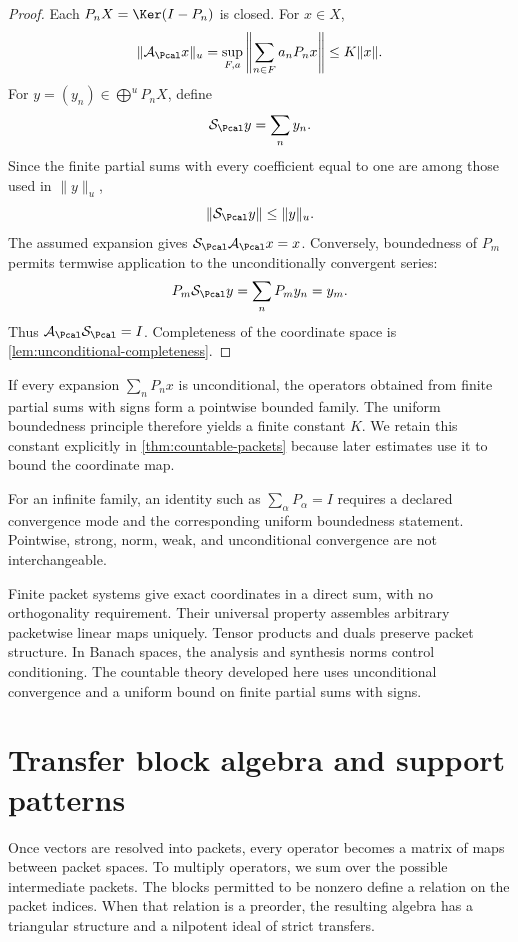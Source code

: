 \begin{proof}
Each $P_nX=\Ker(I-P_n)$ is closed.  For $x\in X$,
\[
\|\mathcal A_{\Pcal}x\|_u
=
\sup_{F,a}
\left\|\sum_{n\in F}a_nP_nx\right\|
\leq K\|x\|.
\]
For $y=(y_n)\in\bigoplus^uP_nX$, define
\[
\mathcal S_{\Pcal}y=\sum_ny_n.
\]
Since the finite partial sums with every coefficient equal to one are among those used in $\|y\|_u$,
\[
\|\mathcal S_{\Pcal}y\|
\leq\|y\|_u.
\]
The assumed expansion gives $\mathcal S_{\Pcal}\mathcal A_{\Pcal}x=x$.  Conversely, boundedness of $P_m$ permits termwise application to the unconditionally convergent series:
\[
P_m\mathcal S_{\Pcal}y
=
\sum_nP_my_n
=y_m.
\]
Thus $\mathcal A_{\Pcal}\mathcal S_{\Pcal}=I$.  Completeness of the coordinate space is \cref{lem:unconditional-completeness}.
\end{proof}

\begin{remark}
\label{rem:uniform-boundedness}
If every expansion $\sum_nP_nx$ is unconditional, the operators obtained from finite partial sums with signs form a pointwise bounded family.  The uniform boundedness principle therefore yields a finite constant $K$.  We retain this constant explicitly in \cref{thm:countable-packets} because later estimates use it to bound the coordinate map.
\end{remark}

\begin{boundary}
\label{bnd:infinite-packet-topology}
For an infinite family, an identity such as $\sum_\alpha P_\alpha=I$ requires a declared convergence mode and the corresponding uniform boundedness statement.  Pointwise, strong, norm, weak, and unconditional convergence are not interchangeable.
\end{boundary}

\begin{sectionrecap}
Finite packet systems give exact coordinates in a direct sum, with no orthogonality requirement.  Their universal property assembles arbitrary packetwise linear maps uniquely.  Tensor products and duals preserve packet structure.  In Banach spaces, the analysis and synthesis norms control conditioning.  The countable theory developed here uses unconditional convergence and a uniform bound on finite partial sums with signs.
\end{sectionrecap}


\section{Transfer block algebra and support patterns}
\begin{readerroadmap}
Once vectors are resolved into packets, every operator becomes a matrix of maps between packet spaces.  To multiply operators, we sum over the possible intermediate packets.  The blocks permitted to be nonzero define a relation on the packet indices.  When that relation is a preorder, the resulting algebra has a triangular structure and a nilpotent ideal of strict transfers.
\end{readerroadmap}
